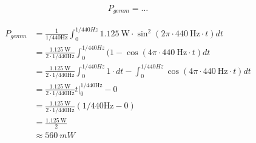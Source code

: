 \documentclass{exam}
\begin{document}
\begin{questions}
		 	\begin{align*}
			    P_{gemm} = \ldots
			\end{align*}

			\begin{solutionordottedlines}[3in]
			\begin{align*}
			    P_{gemm} 	&= \frac{1}{1/440 \text{Hz}} \int_0^{1/440Hz} 1.125~\text{W} \cdot \sin^2 \left(2\pi \cdot 440~\text{Hz} \cdot t\right) dt \\
			    			&=\frac{1.125~\text{W}}{2 \cdot 1/440 \text{Hz}} \int_0^{1/440Hz} (1- \cos(4\pi \cdot 440~\text{Hz} \cdot t) dt \\
			    			&=\frac{1.125~\text{W}}{2 \cdot 1/440 \text{Hz}} \int_0^{1/440Hz} 1 \cdot dt - \int_0^{1/440Hz} \cos(4\pi \cdot 440~\text{Hz} \cdot t) dt \\
			    			&=\frac{1.125~\text{W}}{2 \cdot 1/440 \text{Hz}} t\bigg|^{1/440 \text{Hz}}_0 - 0 \\
			    			&= \frac{1.125~\text{W}}{2 \cdot 1/440 \text{Hz}} (1/440 \text{Hz} - 0)\\
			    			&= \frac{{1.125~\text{W}}}{2}\\
			    			&\approx 560~mW
			\end{align*}

			\end{solutionordottedlines}	
	\end{questions}
\end{document}
